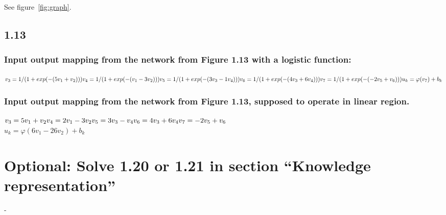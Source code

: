 \documentclass{scrartcl}
\begin{document}
See figure~\ref{fig:graph}.

\subsection{1.13}
\subsubsection{Input output mapping from the network from Figure 1.13 with a logistic function:}
$v_{3} = 1/(1+exp(-(5v_{1}+v_{2})))\\
v_{4} = 1/(1+exp(-(v_{1}-3v_{2})))\\
v_{5}= 1/(1+exp(-(3v_{3}-1v_{4})))\\
v_{6}=1/(1+exp(-(4v_{3}+6v_{4})))\\
v_{7}=1/(1+exp(-(-2v_{5}+v_{6})))\\
u_{k}=\varphi(v_{7})+b_{k}$\\

\subsubsection{Input output mapping from the network from Figure 1.13, supposed to operate in linear region.}
$v_{3} = 5v_{1}+v_{2}\\
v_{4}=2v_{1}-3v_{2}\\
v_{5}=3v_{3}-v_{4}\\
v_{6}=4v_{3}+6v_{4}\\
v_{7}=-2v_{5}+v_{6}$\\
$u_{k}=\varphi(6v_{1} - 26v_{2})+b_{k}$

\section{Optional: Solve 1.20 or 1.21 in section “Knowledge representation”
}
-








%



\end{document}
